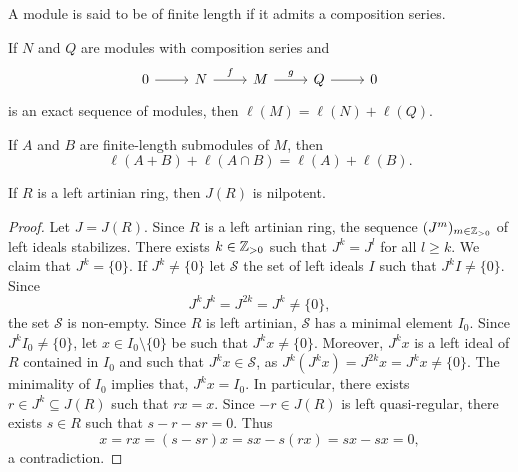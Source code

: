 A module is said to be of finite length if it admits a composition series. 

\begin{exercise}
	If $N$ and $Q$ are modules with composition series and  
	\[
	\begin{tikzcd}
		0 \arrow[r]
		& N \arrow{r}{f}
		& M \arrow{r}{g}
		& Q \arrow[r]
		& 0
	\end{tikzcd}
	\]
	is an exact sequence of modules, then $\ell(M)=\ell(N)+\ell(Q)$.
\end{exercise}


\begin{exercise}
	If $A$ and $B$ are finite-length submodules of $M$, then  
	\[
	\ell(A+B)+\ell(A\cap B)=\ell(A)+\ell(B).
	\]
\end{exercise}

\begin{theorem}
	\label{thm:Jnilpotente}
	If $R$ is a left artinian ring, then $J(R)$ is nilpotent. 
\end{theorem}

\begin{proof}
	Let $J=J(R)$. Since $R$ is a left artinian ring, the sequence 
	$(J^m)_{m\in\mathbb{Z}_{>0}}$ of left ideals stabilizes. There exists 
	$k\in\mathbb{Z}_{>0}$ such that $J^k=J^l$ for all $l\geq k$. We claim that $J^k=\{0\}$. If
	$J^k\ne\{0\}$ let $\mathcal{S}$ the set of left ideals 
	$I$ such that $J^kI\ne\{0\}$. Since 
	\[
	J^kJ^k=J^{2k}=J^k\ne\{0\},
	\]
	the set $\mathcal{S}$ is non-empty. 
	Since $R$ is left artinian, $\mathcal{S}$ has a minimal element $I_0$. Since $J^kI_0\ne\{0\}$, let $x\in
	I_0\setminus\{0\}$ be such that $J^kx\ne\{0\}$. Moreover, $J^kx$ is a left ideal of $R$ 
	contained in $I_0$ and such that $J^kx\in\mathcal{S}$, as 
	$J^k(J^kx)=J^{2k}x=J^kx\ne\{0\}$. The minimality of $I_0$ implies that, $J^kx=I_0$. In particular, 
	there exists $r\in J^k\subseteq J(R)$ such that $rx=x$. Since $-r\in
	J(R)$ is left quasi-regular, there exists $s\in R$ such that $s-r-sr=0$.
	Thus 
	\[
		x=rx=(s-sr)x=sx-s(rx)=sx-sx=0,
	\]
	a contradiction.
\end{proof}

